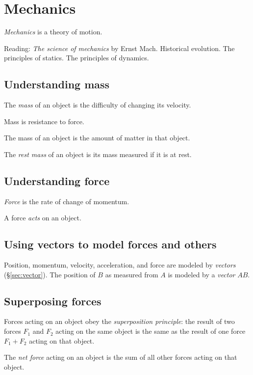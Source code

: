 \chapter{Mechanics}

\emph{Mechanics} is a theory of motion.

Reading:
\emph{The science of mechanics} by Ernst Mach.
Historical evolution.
The principles of statics.
The principles of dynamics.

\section{Understanding mass}

The \emph{mass} of an object is the difficulty of changing its velocity.

Mass is resistance to force.

The mass of an object is the amount of matter in that object.

The \emph{rest mass} of an object is its mass measured if it is at rest.

\section{Understanding force}

\emph{Force} is the rate of change of momentum.

A force \emph{acts} on an object.

\section{Using vectors to model forces and others}

Position, momentum, velocity, acceleration, and force are modeled by \emph{vectors} (\S\ref{sec:vector}).
The position of \(B\) as measured from \(A\) is modeled by a \emph{vector} \(AB\).

\section{Superposing forces}

Forces acting on an object obey the \emph{superposition principle}:
the result of two forces \(F_1\) and \(F_2\) acting on the same object
is the same as the result of one force \(F_1+F_2\) acting on that object.

The \emph{net force} acting on an object is the sum of all other forces acting on that object.

